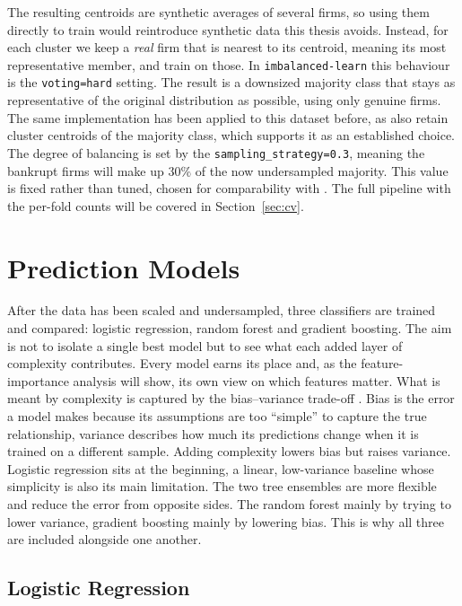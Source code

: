 The resulting centroids are synthetic averages of several firms, so using them
directly to train would reintroduce synthetic data this thesis avoids. Instead,
for each cluster we keep a \emph{real} firm that is nearest to its centroid, meaning its most
representative member, and train on those. In \texttt{imbalanced-learn} this
behaviour is the \texttt{voting=\textquotesingle hard\textquotesingle} setting. The
result is a downsized majority class that stays as representative of the original
distribution as possible, using only genuine firms. The
same implementation has been applied to this dataset before, as
\textcite[11]{ansahnarh2024} also retain cluster centroids of the majority
class, which supports it as an established choice. The degree of balancing is set
by the \texttt{sampling\_strategy=0.3}, meaning the bankrupt
firms will make up $30\%$ of the now undersampled majority. This value is fixed rather
than tuned, chosen for comparability with \textcite{wangliu2021}. The full pipeline
with the per-fold counts will be covered in Section~\ref{sec:cv}.


\section{Prediction Models}
\label{sec:models}

After the data has been scaled and undersampled, three classifiers are trained and
compared: logistic regression, random forest and gradient boosting. The aim is not
to isolate a single best model but to see what each added layer of complexity
contributes. Every model earns its place and, as the feature-importance analysis
will show, its own view on which features matter. What is meant by complexity 
is captured by the bias--variance trade-off
\parencite[p. 31]{islp2023}. Bias is the error a model makes because its
assumptions are too ``simple'' to capture the true relationship, variance describes 
how much its predictions change when it is trained on a different sample. 
Adding complexity lowers bias but raises variance. Logistic
regression sits at the beginning, a linear, low-variance baseline whose simplicity
is also its main limitation. The two tree ensembles are more flexible and reduce
the error from opposite sides. The random forest mainly by trying to lower variance,
gradient boosting mainly by lowering bias. This is why all three are included
alongside one another.


\subsection{Logistic Regression}
\label{sec:lr}

